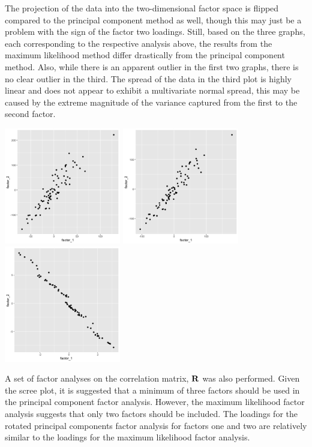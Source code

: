 The projection of the data into the two-dimensional factor space is flipped compared to the principal component method as well, though this may just be a problem with the sign of the factor two loadings. Still, based on the three graphs, each corresponding to the respective analysis above, the results from the maximum likelihood method differ drastically from the principal component method. Also, while there is an apparent outlier in the first two graphs, there is no clear outlier in the third. The spread of the data in the third plot is highly linear and does not appear to exhibit a multivariate normal spread, this may be caused by the extreme magnitude of the variance captured from the first to the second factor.

\begin{center}
	\includegraphics[width=2in]{9_32_S_fa1.png}
	\includegraphics[width=2in]{9_32_S_fa2.png}
	\includegraphics[width=2in]{9_32_S_fa3.png}
\end{center}

A set of factor analyses on the correlation matrix, $\mathrm{\bf{R}}$ was also performed. Given the scree plot, it is suggested that a minimum of three factors should be used in the principal component factor analysis. However, the maximum likelihood factor analysis suggests that only two factors should be included. The loadings for the rotated principal components factor analysis for factors one and two are relatively similar to the loadings for the maximum likelihood factor analysis.

